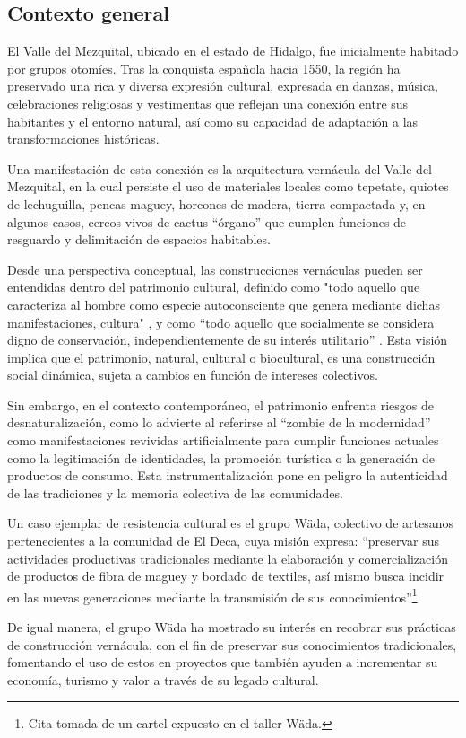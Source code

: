 \subsection{Contexto general}

El Valle del Mezquital, ubicado en el estado de Hidalgo, fue inicialmente habitado por grupos otomíes. Tras la conquista española hacia 1550, la región ha preservado una rica y diversa expresión cultural, expresada en danzas, música, celebraciones religiosas y vestimentas que reflejan una conexión entre sus habitantes y el entorno natural, así como su capacidad de adaptación a las transformaciones históricas.

Una manifestación de esta conexión es la arquitectura vernácula del Valle del Mezquital, en la cual persiste el uso de materiales locales como tepetate, quiotes de lechuguilla, pencas maguey, horcones de madera, tierra compactada y, en algunos casos, cercos vivos de cactus ``órgano'' que cumplen funciones de resguardo y delimitación de espacios habitables.

Desde una perspectiva conceptual, las construcciones vernáculas pueden ser entendidas dentro del patrimonio cultural, definido como "todo aquello que caracteriza al hombre como especie autoconsciente que genera mediante dichas manifestaciones, cultura" \citep{dominguez2004pautas}, y como ``todo aquello que socialmente se considera digno de conservación, independientemente de su interés utilitario'' \citep[p. 63]{prats1998concepto}. Esta visión implica que el patrimonio, natural, cultural o biocultural, es una construcción social dinámica, sujeta a cambios en función de intereses colectivos.

Sin embargo, en el contexto contemporáneo, el patrimonio enfrenta riesgos de desnaturalización, como lo advierte \cite{i2008zombi} al referirse al ``zombie de la modernidad'' como manifestaciones revividas artificialmente para cumplir funciones actuales como la legitimación de identidades, la promoción turística o la generación de productos de consumo. Esta instrumentalización pone en peligro la autenticidad de las tradiciones y la memoria colectiva de las comunidades.

Un caso ejemplar de resistencia cultural es el grupo Wäda, colectivo de artesanos pertenecientes a la comunidad de El Deca, cuya misión expresa: ``preservar sus actividades productivas tradicionales mediante la elaboración y comercialización de productos de fibra de maguey y bordado de textiles, así mismo busca incidir en las nuevas generaciones mediante la transmisión de sus conocimientos''\footnote{Cita tomada de un cartel expuesto en el taller Wäda.}

De igual manera, el grupo Wäda ha mostrado su interés en recobrar sus prácticas de construcción vernácula, con el fin de preservar sus conocimientos tradicionales, fomentando el uso de estos en proyectos que también ayuden a incrementar su economía, turismo y valor a través de su legado cultural.
